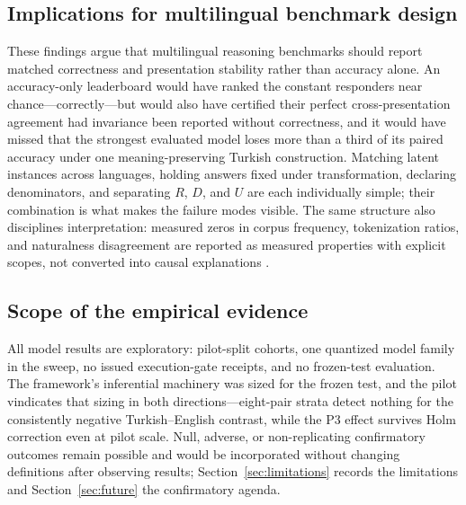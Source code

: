 \subsection{Implications for multilingual benchmark design}

These findings argue that multilingual reasoning benchmarks should report matched correctness and
presentation stability rather than accuracy alone. An accuracy-only leaderboard would have ranked the
constant responders near chance---correctly---but would also have certified their perfect cross-presentation
agreement had invariance been reported without correctness, and it would have missed that the strongest
evaluated model loses more than a third of its paired accuracy under one meaning-preserving Turkish
construction. Matching latent instances across languages, holding answers fixed under transformation,
declaring denominators, and separating $R$, $D$, and $U$ are each individually simple; their combination is
what makes the failure modes visible. The same structure also disciplines interpretation: measured zeros in
corpus frequency, tokenization ratios, and naturalness disagreement are reported as measured properties
with explicit scopes, not converted into causal explanations \citep{rust2021tokenizer, ahia2023languages,
petrov2023tokenizers}.

\subsection{Scope of the empirical evidence}

All model results are exploratory: pilot-split cohorts, one quantized model family in the sweep, no issued
execution-gate receipts, and no frozen-test evaluation. The framework's inferential machinery was sized for
the frozen test, and the pilot vindicates that sizing in both directions---eight-pair strata detect nothing
for the consistently negative Turkish--English contrast, while the P3 effect survives Holm correction even
at pilot scale. Null, adverse, or non-replicating confirmatory outcomes remain possible and would be
incorporated without changing definitions after observing results; Section~\ref{sec:limitations} records
the limitations and Section~\ref{sec:future} the confirmatory agenda.
